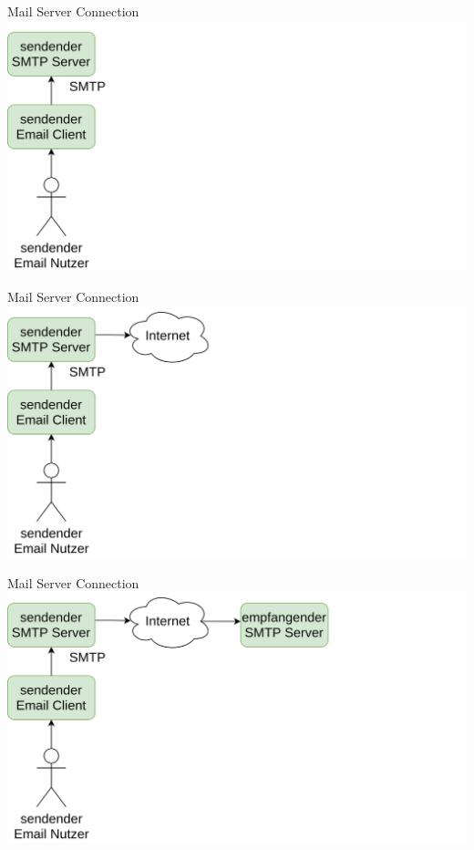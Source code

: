 \documentclass[aspectratio=169]{beamer}
\begin{document}
\begin{frame}[plain]{Mail Server Connection}
    \centering
    \includegraphics[height=.8\textheight]{media/mail-diagram-03.png}
\end{frame}

\begin{frame}[plain]{Mail Server Connection}
    \centering
    \includegraphics[height=.8\textheight]{media/mail-diagram-04.png}
\end{frame}

\begin{frame}[plain]{Mail Server Connection}
    \centering
    \includegraphics[height=.8\textheight]{media/mail-diagram-05.png}
\end{frame}
\end{document}
